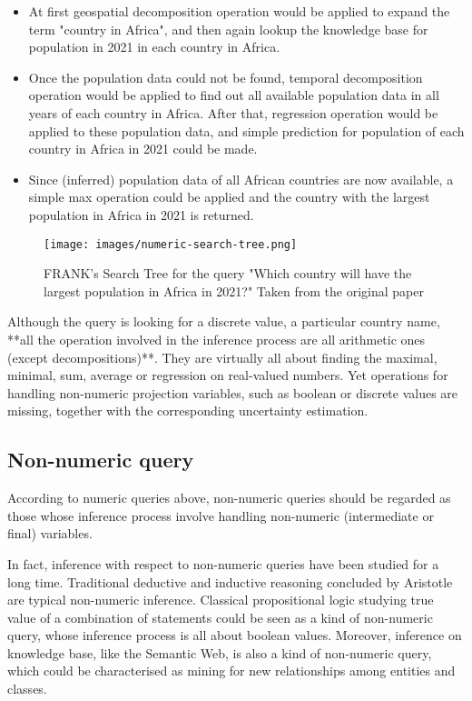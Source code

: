 \documentclass[12pt]{extarticle}
\begin{document}
\begin{itemize}
\item  At first geospatial decomposition operation would be applied to expand the term "country in Africa", and then again lookup the knowledge base for population in 2021 in each country in Africa. 

\item  Once the population data could not be found, temporal decomposition operation would be applied to find out all available population data in all years of each country in Africa. After that, regression operation would be applied to these population data, and simple prediction for population of each country in Africa in 2021 could be made.

\item  Since (inferred) population data of all African countries are now available, a simple max operation could be applied and the country with the largest population in Africa in 2021 is returned.
\end{itemize}

\begin{figure}
    \centering
    \texttt{[image: images/numeric-search-tree.png]}
    \caption{FRANK's Search Tree for the query "Which country will have the largest population in Africa in 2021?" Taken from the original paper\cite{bundy2018automated}}
    \label{Fig:1}
\end{figure}

Although the query is looking for a discrete value, a particular country name, **all the operation involved in the inference process are all arithmetic ones (except decompositions)**. They are virtually all about finding the maximal, minimal, sum, average or regression on real-valued numbers. Yet operations for handling non-numeric projection variables, such as boolean or discrete values are missing, together with the corresponding uncertainty estimation.

\subsection{Non-numeric query}
According to numeric queries above, non-numeric queries should be regarded as those  whose inference process involve handling non-numeric (intermediate or final) variables. 

In fact, inference with respect to non-numeric queries have been studied for a long time.  Traditional deductive and inductive reasoning concluded by  Aristotle are typical non-numeric inference. Classical propositional logic studying true value of a combination of statements could be seen as a kind of non-numeric query, whose inference process is all about boolean values. Moreover, inference on knowledge base, like the Semantic Web, is also a kind of non-numeric query, which could be characterised as mining for new relationships\cite{dalwadi2012semantic} among entities and classes. 
\end{document}
